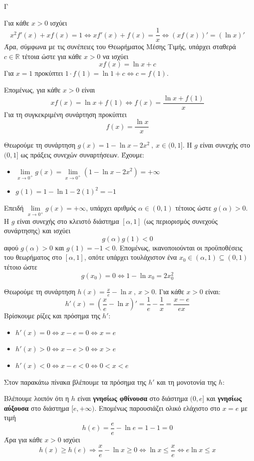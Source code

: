 \begin{thema}{Γ}
\begin{erwthma}
\item Για κάθε $x>0$ ισχύει
\[x^2f'(x)+xf(x)=1 \Leftrightarrow x f'(x)+f(x)=\frac{1}{x} \Leftrightarrow (xf(x))'=(\ln x)'\]
Άρα, σύμφωνα με τις συνέπειες του Θεωρήματος Μέσης Τιμής, υπάρχει σταθερά $c \in \mathbb{R}$ τέτοια ώστε για κάθε $x>0$ να ισχύει
\[xf(x)=\ln x + c\]
Για $x=1$ προκύπτει $1\cdot f(1) = \ln 1 + c \Leftrightarrow c = f(1)$.

Επομένως, για κάθε $x>0$ είναι
\[xf(x)=\ln x + f(1) \Leftrightarrow f(x)=\frac{\ln x+f(1)}{x}\]
Για τη συγκεκριμένη συνάρτηση προκύπτει
\[f(x)=\frac{\ln x}{x}\]

\item Θεωρούμε τη συνάρτηση $g(x)=1-\ln x-2x^2\ ,\ x\in(0,1]$.
Η $g$ είναι συνεχής στο $(0,1]$ ως πράξεις συνεχών συναρτήσεων. Έχουμε:
\begin{itemize}
\item $\lim\limits_{x\to 0^+}{g(x)}=\lim\limits_{x\to 0^+}{(1-\ln x-2x^2)}=+\infty$
\item $g(1)=1-\ln 1-2(1)^2=-1$
\end{itemize}
Επειδή $\lim\limits_{x\to 0^+}{g(x)}=+\infty$, υπάρχει αριθμός $\alpha \in (0,1)$ τέτοιος ώστε $g(\alpha)>0$. 
Η $g$ είναι συνεχής στο κλειστό διάστημα $[\alpha, 1]$ (ως περιορισμός συνεχούς συνάρτησης) και ισχύει
\[g(\alpha)g(1) < 0\]
αφού $g(\alpha)>0$ και $g(1)=-1<0$.
Επομένως, ικανοποιούνται οι προϋποθέσεις του θεωρήματος  στο $[\alpha, 1]$, οπότε υπάρχει τουλάχιστον ένα $x_0\in(\alpha,1) \subseteq (0,1)$ τέτοιο ώστε
\[g(x_0)=0 \Leftrightarrow 1-\ln x_0=2x_0^2\]

\item Θεωρούμε τη συνάρτηση $h(x)=\frac{x}{e}-\ln x\ ,\ x>0$.
Για κάθε $x>0$ είναι:
\[h'(x)=\left(\frac{x}{e}-\ln x\right)'=\frac{1}{e}-\frac{1}{x}=\frac{x-e}{ex}\]
Βρίσκουμε ρίζες και πρόσημα της $h'$:
\begin{itemize}
\item $h'(x)=0 \Leftrightarrow x-e=0 \Leftrightarrow x=e$
\item $h'(x)>0 \Leftrightarrow x-e>0 \Leftrightarrow x>e$
\item $h'(x)<0 \Leftrightarrow x-e<0 \Leftrightarrow 0<x<e$
\end{itemize}
Στον παρακάτω πίνακα βλέπουμε τα πρόσημα της $h'$ και τη μονοτονία της $h$:
\begin{center}
\end{center}
Βλέπουμε λοιπόν ότι η $h$ είναι \textbf{γνησίως φθίνουσα} στο διάστημα $(0,e]$ και \textbf{γνησίως αύξουσα} στο διάστημα $[e,+\infty)$. Επομένως παρουσιάζει ολικό ελάχιστο στο $x=e$ με τιμή
\[h(e)=\frac{e}{e}-\ln e=1-1=0\]
Άρα για κάθε $x>0$ ισχύει
\[h(x)\ge h(e) \Rightarrow \frac{x}{e}-\ln x\ge 0 \Leftrightarrow \ln x\le \frac{x}{e} \Leftrightarrow e\ln x\le x\]


\end{erwthma}
\end{thema}
